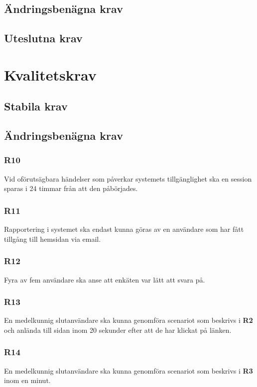 \documentclass{article}
\begin{document}
    \newpage
    \subsection*{Ändringsbenägna krav}
    \subsection*{Uteslutna krav}
    
  
   
    \section{Kvalitetskrav}
    \subsection*{Stabila krav}
    
  
     \subsection*{Ändringsbenägna krav}
     \subsubsection*{R10}
     Vid oförutsägbara händelser som påverkar systemets tillgänglighet ska en session sparas i 24 timmar från att den påbörjades.
     
    
    \subsubsection*{R11}
    Rapportering i systemet ska endast kunna göras av en användare som har fått tillgång till hemsidan via email.
    
     
    \subsubsection*{R12}
    Fyra av fem användare ska anse att enkäten var lätt att svara på.
    
    \subsubsection*{R13}
    En medelkunnig slutanvändare ska kunna genomföra scenariot som beskrivs i \textbf{R2} och anlända till sidan inom 20 sekunder efter att de har klickat på länken.
    
    \subsubsection*{R14}
    En medelkunnig slutanvändare ska kunna genomföra scenariot som beskrivs i \textbf{R3} inom en minut.
    
\end{document}
